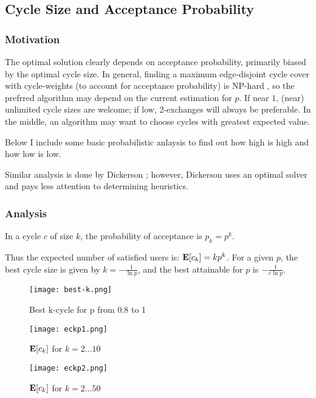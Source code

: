 \documentclass[main.tex]{subfiles}
\begin{document}
\subsection{Cycle Size and Acceptance Probability}

\subsubsection{Motivation}
The optimal solution clearly depends on acceptance probability, primarily biased by the optimal cycle size. In general, finding a maximum edge-disjoint cycle cover with cycle-weights (to account for acceptance probability) is NP-hard \cite{Bir}, so the prefrred algorithm may depend on the current estimation for $p$. If near $1$, (near) unlimited cycle sizes are welcome; if low, 2-exchanges will always be preferable.  In the middle, an algorithm may want to choose cycles with greatest expected value.

Below I include some basic probabilistic anlaysis to find out how high is high and how low is low.

Similar analysis is done by Dickerson \cite{Dick} \cite{Dick3}; however, Dickerson uses an optimal solver and pays less attention to determining heuristics.

\subsubsection{Analysis}

In a cycle $c$ of size $k$, the probability of acceptance is $p_k = p^k$.

Thus the expected number of satisfied users is: $\mathbf{E}[c_k] = k p^k$. For a given $p$, the best cycle size is given by $k = -\frac{1}{\ln p}$, and the best attainable for $p$ is $-\frac{1}{e \ln p}$.

\begin{figure}
  \texttt{[image: best-k.png]}
  \caption{Best k-cycle for p from 0.8 to 1}
  \label{best-k}
\end{figure}

\begin{figure}
  \texttt{[image: eckp1.png]}
  \caption{$\mathbf{E}[c_k]$ for $k = 2 \dots 10$}
  \label{eckp1}
\end{figure}

\begin{figure}
  \texttt{[image: eckp2.png]}
  \caption{$\mathbf{E}[c_k]$ for $k = 2 \dots 50$}
  \label{eckp2}
\end{figure}
\end{document}
